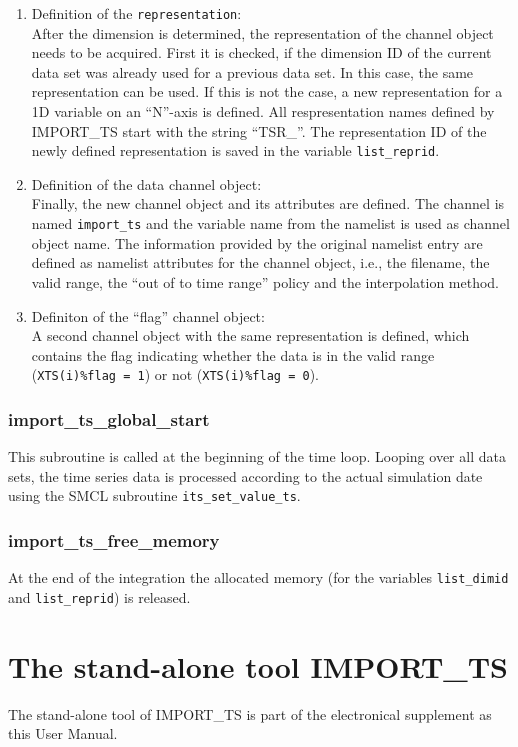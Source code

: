 \documentclass[11pt,twoside]{report}
\begin{document}
\begin{enumerate}
 \item Definition of the \verb|representation|:\\
After the dimension is determined, the representation of the channel object
needs to be acquired. First it is checked, if the dimension ID of the
current data set was already used for a previous data set. In this case,
the same representation can be used.
If this is not the case, a new representation for a 1D variable on an
 ``N''-axis is defined. All respresentation names defined by
 IMPORT\_TS start with 
the string ``TSR\_''. 
The representation ID of the newly defined representation is saved in the
variable \verb|list_reprid|.
\item Definition of the data channel object: \\
Finally, the new channel object and its attributes are defined.
The channel is named \verb|import_ts| and the variable name from the
namelist is used as channel object name. 
The information provided by the original namelist entry are defined as 
namelist attributes for the channel object, i.e., the filename, the valid range,
the ``out of to time range'' policy and the interpolation method.

\item Definiton of the ``flag'' channel object:\\
 A second channel object with the same representation is defined, which contains
the flag indicating whether the data is in the valid range 
(\verb|XTS(i)%flag = 1|) or not (\verb|XTS(i)%flag = 0|).
\end{enumerate}

\subsubsection{import\_ts\_global\_start}
This subroutine is called at the beginning of the time loop.
Looping over all data sets,  the time series data is processed according to the 
 actual simulation date using the SMCL subroutine \verb|its_set_value_ts|.
\subsubsection{import\_ts\_free\_memory}
At the end of the integration the allocated memory (for the
variables \verb|list_dimid| and \verb|list_reprid|) is released. 

\section{The stand-alone tool IMPORT\_TS\label{ITSBOX}}
The stand-alone tool of IMPORT\_TS is part of the electronical supplement
as this User Manual. 
\end{document}
